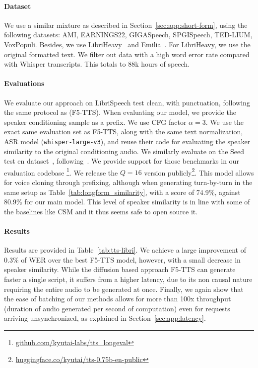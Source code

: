 \paragraph{Dataset} We use a similar mixture as described in Section~\ref{sec:app:short-form}, using the following datasets: AMI, EARNINGS22, GIGASpeech, SPGISpeech, TED-LIUM, VoxPopuli. Besides, we use LibriHeavy~\citep{kang2023libriheavy} and Emilia~\citep{he2024emilia}.
For LibriHeavy, we use the original formatted text. We filter out data with a high word error rate compared with Whisper transcripts. This totals to 88k hours of speech.

\paragraph{Evaluations}

We evaluate our approach on LibriSpeech test clean, with punctuation, following the same protocol as \citet{chen2024f5} (F5-TTS). When evaluating our model, we provide the speaker conditioning sample as a prefix.
We use CFG factor $\alpha = 3$.
We use the exact same evaluation set as F5-TTS, along with the same text normalization, ASR model (\texttt{whisper-large-v3}), and reuse their code for evaluating the speaker similarity to the original conditioning audio.
We similarly evaluate on the Seed test en dataset~\citep{anastassiou2024seed}, following~\citep{du2025cosyvoice}.
We provide support for those benchmarks in our evaluation codebase \footnote{\href{https://github.com/kyutai-labs/tts_longeval}{github.com/kyutai-labs/tts\_longeval}}.
We release the $Q=16$ version publicly\footnote{\href{https://huggingface.co/kyutai/tts-0.75b-en-public}{huggingface.co/kyutai/tts-0.75b-en-public}}. This model allows for voice cloning through prefixing, although when generating turn-by-turn in the same setup as Table~\ref{tab:longform_similarity}, with a score of 74.9\%, against 80.9\% for our main model. This level of speaker similarity is in line with some of the baselines like CSM and it thus seems safe to open source it.

\paragraph{Results}

Results are provided in Table~\ref{tab:tts-libri}.
We achieve a large improvement of 0.3\% of WER over the best F5-TTS model, however, with a small decrease in speaker similarity. While the diffusion based approach F5-TTS can generate faster a single script, it suffers from a higher latency, due to its non causal nature requiring the entire audio to be generated at once. Finally, we again show that the ease of batching of our methods allows for more than 100x throughput (duration of audio generated per second of computation) even for requests arriving unsynchronized, as explained in Section~\ref{sec:app:latency}.

